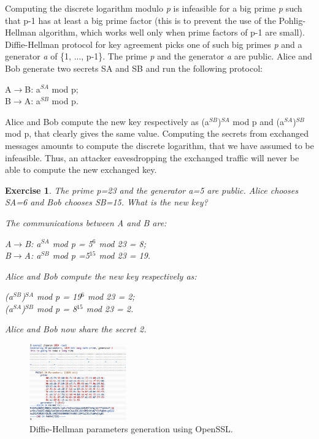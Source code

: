 \documentclass[a4paper, 12pt]{report}
\newtheorem{exercise}{\textbf{Exercise}}
\begin{document}
Computing the discrete logarithm modulo \textit{p} is infeasible for a big prime \textit{p} such that p-1 has at least a big prime factor (this is to prevent the use of the Pohlig-Hellman algorithm, which works well only when prime factors of p-1 are small). Diffie-Hellman protocol for key agreement picks one of such big primes \textit{p} and a generator \textit{a} of \{1, ..., p-1\}. The prime \textit{p} and the generator \textit{a} are public. Alice and Bob generate two secrets SA and SB and run the following protocol:
\begin{center}
	A$\rightarrow$B: a$^{SA}$ mod p;\\
	B$\rightarrow$A: a$^{SB}$ mod p.
\end{center}
Alice and Bob compute the new key respectively as (a$^{SB}$)$^{SA}$ mod p and (a$^{SA}$)$^{SB}$ mod p, that clearly gives the same value. Computing the secrets from exchanged messages amounts to compute the discrete logarithm, that we have assumed to be infeasible. Thus, an attacker eavesdropping the exchanged traffic will never be able to compute the new exchanged key.

\begin{exercise}
	The prime p=23 and the generator a=5 are public. Alice chooses SA=6 and Bob chooses SB=15. What is the new key?
	
	The communications between A and B are:
	\begin{center}
		A$\rightarrow$B: a$^{SA}$ mod p = 5$^6$ mod 23 = 8;\\
		B$\rightarrow$A: a$^{SB}$ mod p =5$^{15}$ mod 23 = 19.
	\end{center}

	Alice and Bob compute the new key respectively as:
	\begin{center}
		(a$^{SB}$)$^{SA}$ mod p = 19$^6$ mod 23 = 2;\\
		(a$^{SA}$)$^{SB}$ mod p = 8$^{15}$ mod 23 = 2.
	\end{center}
	Alice and Bob now share the secret 2.	
\end{exercise}

\begin{figure}
	\includegraphics[width=0.37\textwidth]{images/lec22/dh.png}
	\caption{Diffie-Hellman parameters generation using OpenSSL.}
	\label{fig:dh}
\end{figure}
\end{document}
